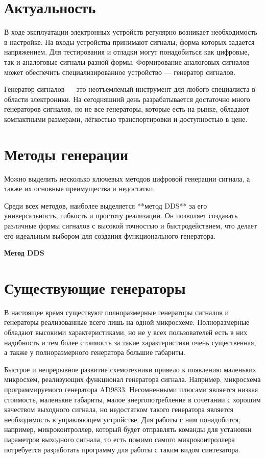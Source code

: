 \documentclass[a4paper, 14pt]{extarticle}
\begin{document}
\section*{Актуальность}
	В ходе эксплуатации электронных устройств регулярно возникает необходимость в настройке. На входы устройства принимают сигналы, форма которых задается напряжением. Для тестирования и отладки могут понадобиться как цифровые, так и аналоговые сигналы разной формы. Формирование аналоговых сигналов может обеспечить специализированное устройство --- генератор сигналов.
	
	Генератор сигналов --- это неотъемлемый инструмент для любого специалиста в области электроники. На сегодняшний день разрабатывается достаточно много генераторов сигналов, но не все генераторы, которые есть на рынке, обладают компактными размерами, лёгкостью транспортировки и доступностью в цене. 

\section*{Методы генерации}
Можно выделить несколько ключевых методов цифровой генерации сигнала, а также их основные преимущества и недостатки.

Среди всех методов, наиболее выделяется **метод DDS** за его универсальность,
 гибкость и простоту реализации. Он позволяет создавать различные формы сигналов
 с высокой точностью и быстродействием, что делает его идеальным выбором для создания функционального генератора.
 
\textbf{Метод DDS}

\section*{Существующие генераторы}	
	В настоящее время существуют полноразмерные генераторы сигналов и генераторы реализованные всего лишь на одной микросхеме. Полноразмерные обладают высокими характеристиками, но не у всех пользователей есть в них надобность и тем более стоимость за такие характеристики очень существенная, а также у полноразмерного генератора большие габариты.
	
	Быстрое и непрерывное развитие схемотехники привело к появлению маленьких микросхем, реализующих функционал генератора сигнала. Например, микросхема программируемого генератора AD9833. Несомненными плюсами является низкая стоимость, маленькие габариты, малое энергопотребление в сочетании с хорошим качеством выходного сигнала, но недостатком такого генератора является необходимость в управляющем устройстве. Для работы с ним понадобится, например, микроконтроллер, который будет отправлять команды для установки параметров выходного сигнала, то есть помимо самого микроконтроллера потребуется разработать программу для работы с таким видом синтезатора.
\end{document}
